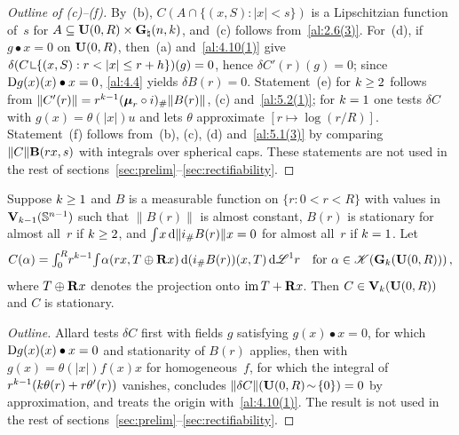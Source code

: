 \begin{proof}[Outline of (c)--(f)]
    By~(b), $C(A \cap \{ (x,S) : |x| < s \})$ is a Lipschitzian function of~$s$ for $A \subseteq
    \mathbf{U}(0,R) \times \mathbf{G}_{\natural}(n,k)$, and~(c) follows from~\ref{al:2.6(3)}. For~(d), if
    $g \bullet x = 0$ on $\mathbf{U}(0,R)$, then~(a) and~\ref{al:4.10(1)} give $\delta(C \restrict \{
    (x,S) : r < |x| \le r + h \})(g) = 0$, hence $\delta C'(r)(g) = 0$; since $\mathrm{D} g(x)(x) \bullet
    x = 0$, \ref{al:4.4} yields $\delta B(r) = 0$. Statement~(e) for $k \ge 2$ follows from
    $\|C'(r)\| = r^{k-1} (\boldsymbol{\mu}_{r} \circ i)_\# \|B(r)\|$, (c) and~\ref{al:5.2(1)}; for $k =
    1$ one tests $\delta C$ with $g(x) = \theta(|x|) u$ and lets $\theta$ approximate $[r \mapsto
    \log(r/R)]$. Statement~(f) follows from~(b), (c), (d) and~\ref{al:5.1(3)} by comparing
    $\|C\| \mathbf{B}(rx,s)$ with integrals over spherical caps. These statements are not used in
    the rest of sections~\ref{sec:prelim}--\ref{sec:rectifiability}.
\end{proof}

\begin{theorem}
    \label{al:5.2(3)}
    Suppose $k \ge 1$ and $B$ is a measurable function on $\{ r : 0 < r < R \}$ with values in
    $\mathbf{V}_{k-1}(\mathbb{S}^{n-1})$ such that $\|B(r)\|$ is almost constant, $B(r)$ is
    stationary for almost all~$r$ if $k \ge 2$, and ${\textstyle\int_{}^{}} x \,\mathrm{d} \|i_\# B(r)\| x = 0$
    for almost all~$r$ if $k = 1$. Let
    \begin{displaymath}
        C(\alpha) = {\textstyle\int_{0}^{R}} r^{k-1} {\textstyle\int_{}^{}} \alpha(r x, T \oplus \mathbf{R} x) \,\mathrm{d}
        (i_\# B(r))(x,T) \,\mathrm{d} \mathscr{L}^1 r \quad \text{for $\alpha \in \mathscr{K}(\mathbf{G}_{k}(\mathbf{U}(0,R)))$}
        \,,
    \end{displaymath}
    where $T \oplus \mathbf{R} x$ denotes the projection onto $\operatorname{im} T + \mathbf{R} x$. Then $C \in
    \mathbf{V}_{k}(\mathbf{U}(0,R))$ and $C$ is stationary.
\end{theorem}

\begin{proof}[Outline]
    Allard tests $\delta C$ first with fields $g$ satisfying $g(x) \bullet x = 0$, for which
    $\mathrm{D} g(x)(x) \bullet x = 0$ and stationarity of $B(r)$ applies, then with $g(x) = \theta(|x|)
    f(x) x$ for homogeneous~$f$, for which the integral of $r^{k-1} (k \theta(r) + r
    \theta'(r))$ vanishes, concludes $\|\delta C\|(\mathbf{U}(0,R) \!\sim\! \{0\}) = 0$ by
    approximation, and treats the origin with~\ref{al:4.10(1)}. The result is not used in the rest
    of sections~\ref{sec:prelim}--\ref{sec:rectifiability}.
\end{proof}

